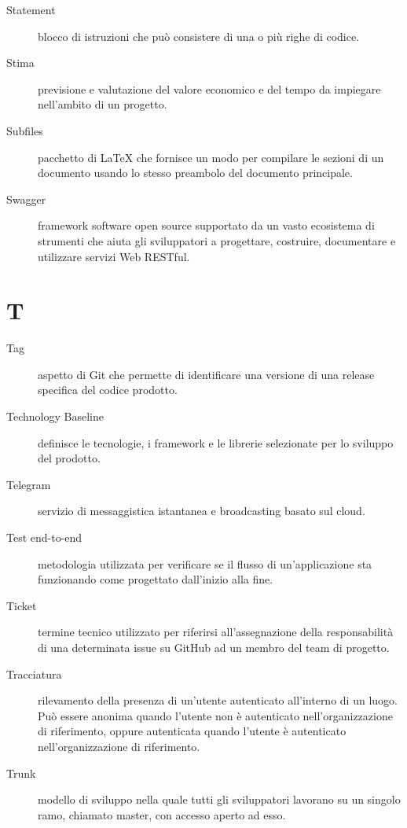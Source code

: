 \documentclass{article}
\begin{document}
\begin{description}
  \item[Statement] blocco di istruzioni che può consistere di una o più righe di codice.
  \item[Stima] previsione e valutazione del valore economico e del tempo da impiegare nell'ambito di un progetto.
  \item[Subfiles] pacchetto di LaTeX che fornisce un modo per compilare le sezioni di un documento usando lo stesso preambolo del documento principale.
  \item[Swagger] framework software open source supportato da un vasto ecosistema di strumenti che aiuta gli sviluppatori a progettare, costruire, documentare e utilizzare servizi Web RESTful.
\end{description}
\newpage
\section{T}
\begin{description}
  \item[Tag] aspetto di Git che permette di identificare una versione di una release specifica del codice prodotto.
  \item[Technology Baseline] definisce le tecnologie, i framework e le librerie selezionate per lo sviluppo del prodotto.
  \item[Telegram] servizio di messaggistica istantanea e broadcasting basato sul cloud.
  \item[Test end-to-end] metodologia utilizzata per verificare se il flusso di un'applicazione sta funzionando come progettato dall'inizio alla fine.
  \item[Ticket] termine tecnico utilizzato per riferirsi all'assegnazione della responsabilità di una determinata issue su GitHub ad un membro del team di progetto.
  \item[Tracciatura] rilevamento della presenza di un'utente autenticato all'interno di un luogo. Può essere anonima quando l'utente non è autenticato nell'organizzazione di riferimento, oppure autenticata quando l'utente è autenticato nell'organizzazione di riferimento.
  \item[Trunk] modello di sviluppo nella quale tutti gli sviluppatori lavorano su un singolo ramo, chiamato master, con accesso aperto ad esso.
\end{description}
\newpage
\end{document}
